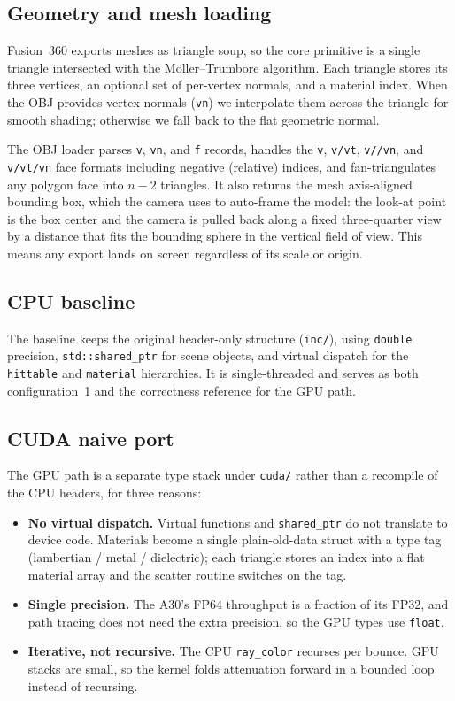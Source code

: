 \documentclass[11pt]{article}
\begin{document}
\subsection{Geometry and mesh loading}

Fusion~360 exports meshes as triangle soup, so the core primitive is a single
triangle intersected with the M\"oller--Trumbore algorithm. Each triangle stores its
three vertices, an optional set of per-vertex normals, and a material index. When the
OBJ provides vertex normals (\texttt{vn}) we interpolate them across the triangle for
smooth shading; otherwise we fall back to the flat geometric normal.

The OBJ loader parses \texttt{v}, \texttt{vn}, and \texttt{f} records, handles the
\texttt{v}, \texttt{v/vt}, \texttt{v//vn}, and \texttt{v/vt/vn} face formats including
negative (relative) indices, and fan-triangulates any polygon face into $n-2$
triangles. It also returns the mesh axis-aligned bounding box, which the camera uses
to auto-frame the model: the look-at point is the box center and the camera is pulled
back along a fixed three-quarter view by a distance that fits the bounding sphere in
the vertical field of view. This means any export lands on screen regardless of its
scale or origin.

\subsection{CPU baseline}

The baseline keeps the original header-only structure (\texttt{inc/}), using
\texttt{double} precision, \texttt{std::shared\_ptr} for scene objects, and virtual
dispatch for the \texttt{hittable} and \texttt{material} hierarchies. It is
single-threaded and serves as both configuration~1 and the correctness reference for
the GPU path.

\subsection{CUDA naive port}

The GPU path is a separate type stack under \texttt{cuda/} rather than a recompile of
the CPU headers, for three reasons:

\begin{itemize}
  \item \textbf{No virtual dispatch.} Virtual functions and \texttt{shared\_ptr} do
        not translate to device code. Materials become a single plain-old-data struct
        with a type tag (lambertian / metal / dielectric); each triangle stores an
        index into a flat material array and the scatter routine switches on the tag.
  \item \textbf{Single precision.} The A30's FP64 throughput is a fraction of its
        FP32, and path tracing does not need the extra precision, so the GPU types use
        \texttt{float}.
  \item \textbf{Iterative, not recursive.} The CPU \texttt{ray\_color} recurses per
        bounce. GPU stacks are small, so the kernel folds attenuation forward in a
        bounded loop instead of recursing.
\end{itemize}
\end{document}
